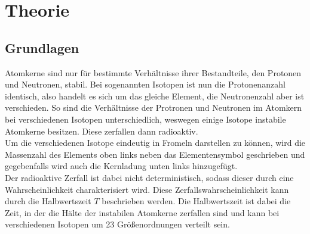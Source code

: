 \section{Theorie}
\label{sec:Theorie}
\subsection{Grundlagen}
\label{sec:Grundlagen}
Atomkerne sind nur für bestimmte Verhältnisse ihrer Bestandteile, den Protonen und Neutronen, stabil.
Bei sogenannten Isotopen ist nun die Protonenanzahl identisch, also handelt es sich um das gleiche 
Element, die Neutronenzahl aber ist verschieden. So sind die Verhältnisse der Protronen und Neutronen
im Atomkern bei verschiedenen Isotopen unterschiedlich, weswegen einige Isotope instabile Atomkerne
besitzen. Diese zerfallen dann radioaktiv.\\
Um die verschiedenen Isotope eindeutig in Fromeln darstellen zu können, wird die Massenzahl des Elements
oben links neben das Elementensymbol geschrieben und gegebenfalls wird auch die Kernladung unten links 
hinzugefügt.\\
Der radioaktive Zerfall ist dabei nicht deterministisch, sodass dieser durch eine Wahrscheinlichkeit 
charakterisiert wird. Diese Zerfallswahrscheinlichkeit kann durch die Halbwertszeit $T$ beschrieben 
werden. Die Halbwertszeit ist dabei die Zeit, in der die Hälte der instabilen Atomkerne zerfallen sind
und kann bei verschiedenen Isotopen um 23 Größenordnungen verteilt sein.\\
